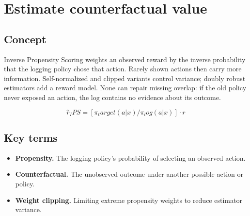 \section{Estimate counterfactual value}

\begin{abstract}
Propensity weighting asks how outcomes would look under a different exposure policy.
\end{abstract}

\subsection{Concept}
Inverse Propensity Scoring weights an observed reward by the inverse probability that the logging policy chose that action. Rarely shown actions then carry more information. Self-normalized and clipped variants control variance; doubly robust estimators add a reward model. None can repair missing overlap: if the old policy never exposed an action, the log contains no evidence about its outcome.

\begin{equation*}
r̂_IPS = [π_target(a|x) / π_log(a|x)] \cdot r
\end{equation*}

\subsection{Key terms}
\begin{itemize}
\item \textbf{Propensity.} The logging policy’s probability of selecting an observed action.
\item \textbf{Counterfactual.} The unobserved outcome under another possible action or policy.
\item \textbf{Weight clipping.} Limiting extreme propensity weights to reduce estimator variance.
\end{itemize}
